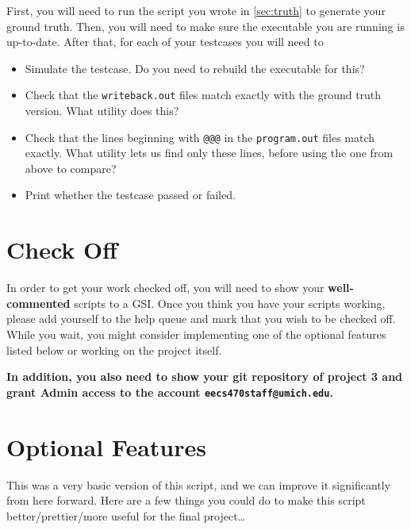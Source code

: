 \documentclass[dvipsnames]{article}
\begin{document}
First, you will need to run the script you wrote in \cref{sec:truth} to generate
your ground truth. Then, you will need to make sure the executable you are 
running is up-to-date. After that, for each of your testcases you will need to
\begin{itemize}
	\item Simulate the testcase. Do you need to rebuild the executable
		for this?
	\item Check that the \texttt{writeback.out} files match exactly with
		the ground truth version. What utility does this?
	\item Check that the lines beginning with \texttt{@@@} in the 
		\texttt{program.out} files match exactly. What utility lets us
		find only these lines, before using the one from above to
		compare?
	\item Print whether the testcase passed or failed.
\end{itemize}

\section{Check Off}
In order to get your work checked off, you will need to show your \textbf{well-commented}
scripts to a GSI. Once you think you have your scripts working, please add 
yourself to the help queue and mark that you wish to be checked off. While you
wait, you might consider implementing one of the optional features listed below
or working on the project itself.

\textbf{In addition, you also need to show your git repository of project 3 and grant Admin access to the account \texttt{eecs470staff@umich.edu}.}

\appendix

\section{Optional Features}
This was a very basic version of this script, and we can improve it
significantly from here forward. Here are a few things you could do to make this
script better/prettier/more useful for the final project\dots
\end{document}
